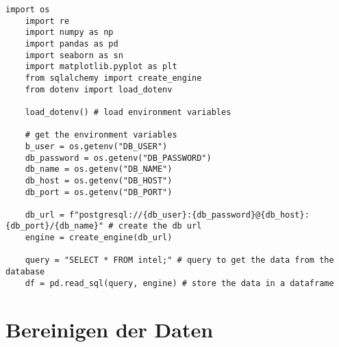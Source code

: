\lstset{
	breaklines=true,         %
	breakatwhitespace=false, %
	basicstyle=\ttfamily,    %
}

\begin{lstlisting}[caption={\texttt{visualization.ipynb}},captionpos=b]
    import os
    import re
    import numpy as np
    import pandas as pd
    import seaborn as sn
    import matplotlib.pyplot as plt
    from sqlalchemy import create_engine
    from dotenv import load_dotenv

    load_dotenv() # load environment variables

    # get the environment variables
    b_user = os.getenv("DB_USER")
    db_password = os.getenv("DB_PASSWORD")
    db_name = os.getenv("DB_NAME")
    db_host = os.getenv("DB_HOST")
    db_port = os.getenv("DB_PORT")

    db_url = f"postgresql://{db_user}:{db_password}@{db_host}:{db_port}/{db_name}" # create the db url
    engine = create_engine(db_url)

    query = "SELECT * FROM intel;" # query to get the data from the database
    df = pd.read_sql(query, engine) # store the data in a dataframe
\end{lstlisting}

\section{Bereinigen der Daten}